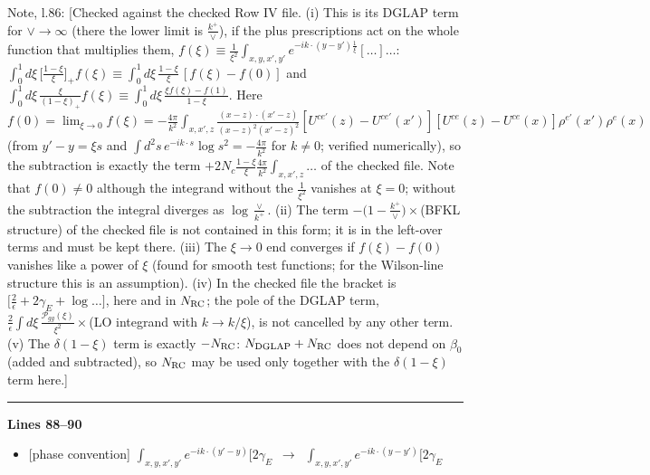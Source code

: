 \documentclass[10pt]{article}
\newenvironment{notebox}{\def\FrameCommand{{\color{notebar}\vrule width 1.5pt}\hspace{6pt}}\MakeFramed{\advance\hsize-\width\FrameRestore}\small}{\endMakeFramed}
\begin{document}
\begin{notebox}\textsf{\small Note, l.86:} [Checked against the checked Row IV file. (i) This is its DGLAP term for $\vee\to\infty$ (there the lower limit is $\frac{k^{+}}{\vee}$), if the plus prescriptions act on the whole function that multiplies them, $f(\xi)\equiv\frac{1}{\xi^{2}}\int_{x,y,x',y'}e^{-ik\cdot(y-y')\frac{1}{\xi}}[\dots]\dots$: $\int_{0}^{1}d\xi\,\big[\frac{1-\xi}{\xi}\big]_{+}f(\xi)\equiv\int_{0}^{1}d\xi\,\frac{1-\xi}{\xi}\,[f(\xi)-f(0)]$ and $\int_{0}^{1}d\xi\,\frac{\xi}{(1-\xi)_{+}}f(\xi)\equiv\int_{0}^{1}d\xi\,\frac{\xi f(\xi)-f(1)}{1-\xi}$. Here $f(0)=\lim_{\xi\to0}f(\xi)=-\frac{4\pi}{k^{2}}\int_{x,x',z}\frac{(x-z)\cdot(x'-z)}{(x-z)^{2}(x'-z)^{2}}[U^{ce'}(z)-U^{ce'}(x')][U^{ce}(z)-U^{ce}(x)]\rho^{e'}(x')\rho^{e}(x)$ (from $y'-y=\xi s$ and $\int d^{2}s\,e^{-ik\cdot s}\log s^{2}=-\frac{4\pi}{k^{2}}$ for $k\neq0$; verified numerically), so the subtraction is exactly the term $+2N_{c}\frac{1-\xi}{\xi}\frac{4\pi}{k^{2}}\int_{x,x',z}\dots$ of the checked file. Note that $f(0)\neq0$ although the integrand without the $\frac{1}{\xi^{2}}$ vanishes at $\xi=0$; without the subtraction the integral diverges as $\log\frac{\vee}{k^{+}}$. (ii) The term $-\big(1-\frac{k^{+}}{\vee}\big)\times$(BFKL structure) of the checked file is not contained in this form; it is in the left-over terms and must be kept there. (iii) The $\xi\to0$ end converges if $f(\xi)-f(0)$ vanishes like a power of $\xi$ (found for smooth test functions; for the Wilson-line structure this is an assumption). (iv) In the checked file the bracket is $\big[\frac{2}{\epsilon}+2\gamma_{E}+\log\dots\big]$, here and in $N_{\rm RC}$; the pole of the DGLAP term, $\frac{2}{\epsilon}\int d\xi\,\frac{\mathcal P_{gg}(\xi)}{\xi^{2}}\times$(LO integrand with $k\to k/\xi$), is not cancelled by any other term. (v) The $\delta(1-\xi)$ term is exactly $-N_{\rm RC}$: $N_{\rm DGLAP}+N_{\rm RC}$ does not depend on $\beta_{0}$ (added and subtracted), so $N_{\rm RC}$ may be used only together with the $\delta(1-\xi)$ term here.]\end{notebox}
\noindent\rule{\linewidth}{0.3pt}\par\noindent\textbf{Lines 88--90} \par
\begin{itemize}[leftmargin=2.2em,itemsep=1pt,topsep=2pt]
\item[\textbf{l.88}] \textsf{\small [phase convention]} $\displaystyle \int_{x,y,x',y'}e^{-ik\cdot(y'-y)}\Big[2\gamma_{E}$\ $\longrightarrow$\ $\displaystyle \int_{x,y,x',y'}e^{-ik\cdot(y-y')}\Big[2\gamma_{E}$
\end{itemize}
\end{document}
